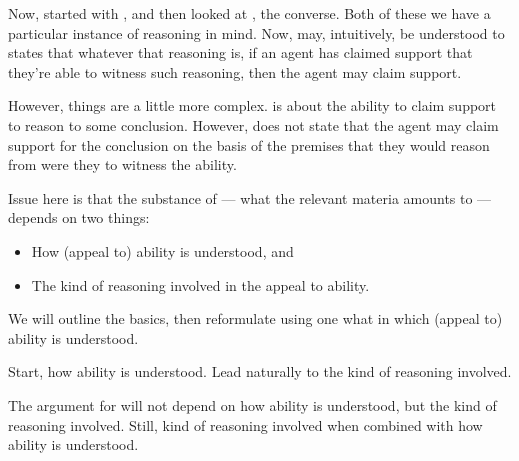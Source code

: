 \begin{note}
  Now, started with \USE{}, and then looked at \ESU{}, the converse.
  Both of these we have a particular instance of reasoning in mind.
  Now, \EAS{} may, intuitively, be understood to states that whatever that reasoning is, if an agent has claimed support that they're able to witness such reasoning, then the agent may claim support.

  However, things are a little more complex.
  \EAS{} is about the ability to claim support to reason to some conclusion.
  However, \EAS{} does not state that the agent may claim support for the conclusion on the basis of the premises that they would reason from were they to witness the ability.

  Issue here is that the substance of \EAS{} --- what the relevant materia amounts to --- depends on two things:
  \begin{itemize}
  \item How (appeal to) ability is understood, and
  \item The kind of reasoning involved in the appeal to ability.
  \end{itemize}

  We will outline the basics, then reformulate \EAS{} using one what in which (appeal to) ability is understood.

  Start, how ability is understood.
  Lead naturally to the kind of reasoning involved.

  The argument for \EAS{} will not depend on how ability is understood, but the kind of reasoning involved.
  Still, kind of reasoning involved when combined with how ability is understood.
\end{note}

